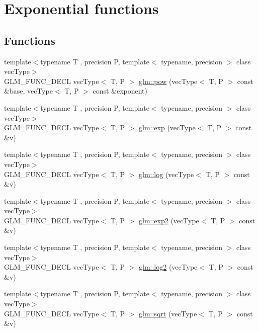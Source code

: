 \hypertarget{group__core__func__exponential}{}\section{Exponential functions}
\label{group__core__func__exponential}
\subsection*{Functions}
\begin{DoxyCompactItemize}
\item 
{\footnotesize template$<$typename T , precision P, template$<$ typename, precision $>$ class vec\+Type$>$ }\\G\+L\+M\+\_\+\+F\+U\+N\+C\+\_\+\+D\+E\+CL vec\+Type$<$ T, P $>$ \hyperlink{group__core__func__exponential_ga082b332a4b7c6ad1d43e09ff19e214dd}{glm\+::pow} (vec\+Type$<$ T, P $>$ const \&base, vec\+Type$<$ T, P $>$ const \&exponent)
\item 
{\footnotesize template$<$typename T , precision P, template$<$ typename, precision $>$ class vec\+Type$>$ }\\G\+L\+M\+\_\+\+F\+U\+N\+C\+\_\+\+D\+E\+CL vec\+Type$<$ T, P $>$ \hyperlink{group__core__func__exponential_ga25e54a7f44fc49ec6ac6ffc7675cf04a}{glm\+::exp} (vec\+Type$<$ T, P $>$ const \&v)
\item 
{\footnotesize template$<$typename T , precision P, template$<$ typename, precision $>$ class vec\+Type$>$ }\\G\+L\+M\+\_\+\+F\+U\+N\+C\+\_\+\+D\+E\+CL vec\+Type$<$ T, P $>$ \hyperlink{group__core__func__exponential_ga21efca311e62d233de0ae96bab126b83}{glm\+::log} (vec\+Type$<$ T, P $>$ const \&v)
\item 
{\footnotesize template$<$typename T , precision P, template$<$ typename, precision $>$ class vec\+Type$>$ }\\G\+L\+M\+\_\+\+F\+U\+N\+C\+\_\+\+D\+E\+CL vec\+Type$<$ T, P $>$ \hyperlink{group__core__func__exponential_ga42ca440d9062f1f456f5a9e896378f9c}{glm\+::exp2} (vec\+Type$<$ T, P $>$ const \&v)
\item 
{\footnotesize template$<$typename T , precision P, template$<$ typename, precision $>$ class vec\+Type$>$ }\\G\+L\+M\+\_\+\+F\+U\+N\+C\+\_\+\+D\+E\+CL vec\+Type$<$ T, P $>$ \hyperlink{group__core__func__exponential_gabae30945338a555a03733f00dad95d0d}{glm\+::log2} (vec\+Type$<$ T, P $>$ const \&v)
\item 
{\footnotesize template$<$typename T , precision P, template$<$ typename, precision $>$ class vec\+Type$>$ }\\G\+L\+M\+\_\+\+F\+U\+N\+C\+\_\+\+D\+E\+CL vec\+Type$<$ T, P $>$ \hyperlink{group__core__func__exponential_gae7ac2e44c14d4e8004098d0bfba6e2b8}{glm\+::sqrt} (vec\+Type$<$ T, P $>$ const \&v)

\end{DoxyCompactItemize}
